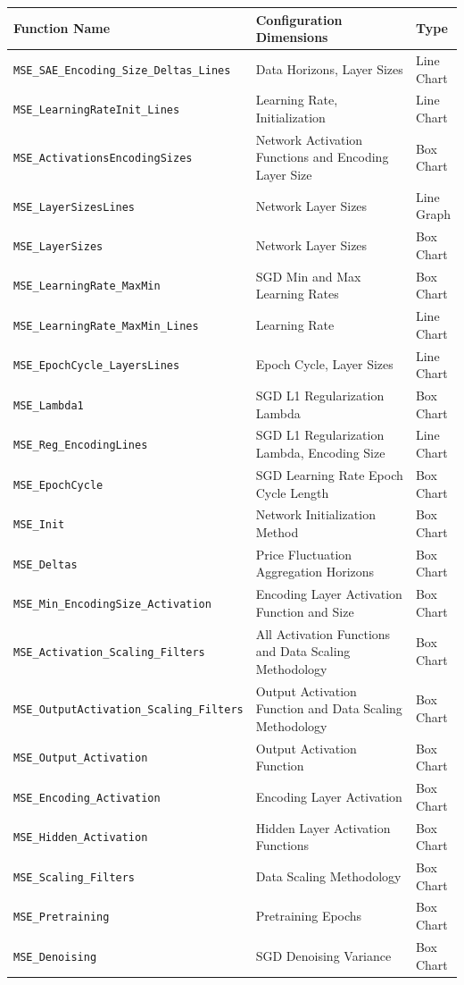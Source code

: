 \documentclass[a4paper,11pt,oneside]{article}
\theoremstyle{plain}
\theoremstyle{definition}
\begin{document}
	\newpage
	\begin{longtable}{|p{0.5\linewidth}|p{0.4\linewidth}|p{0.1\linewidth}|}
		\hline
		\rowcolor{beaublue}
		\textbf{Function Name} &\textbf{Configuration Dimensions}&\textbf{Type}  \\\hline	
		\texttt{MSE\_SAE\_Encoding\_Size\_Deltas\_Lines} & {Data Horizons, Layer Sizes}& {Line Chart} \\\hline
		\texttt{MSE\_LearningRateInit\_Lines} & {Learning Rate, Initialization}& {Line Chart} \\\hline
		\texttt{MSE\_ActivationsEncodingSizes} & {Network Activation Functions and Encoding Layer Size}& {Box Chart} \\\hline
		\texttt{MSE\_LayerSizesLines} & {Network Layer Sizes}& {Line Graph} \\\hline
		\texttt{MSE\_LayerSizes} & {Network Layer Sizes}& {Box Chart} \\\hline
		\texttt{MSE\_LearningRate\_MaxMin} & {SGD Min and Max Learning Rates}& {Box Chart} \\\hline
		\texttt{MSE\_LearningRate\_MaxMin\_Lines} & {Learning Rate}& {Line Chart} \\\hline
		\texttt{MSE\_EpochCycle\_LayersLines} & {Epoch Cycle, Layer Sizes}& {Line Chart} \\\hline		
		\texttt{MSE\_Lambda1} & {SGD L1 Regularization Lambda}& {Box Chart} \\\hline		
		\texttt{MSE\_Reg\_EncodingLines} & {SGD L1 Regularization Lambda, Encoding Size}& {Line Chart} \\\hline
		\texttt{MSE\_EpochCycle} & {SGD Learning Rate Epoch Cycle Length}& {Box Chart} \\\hline
		\texttt{MSE\_Init} & {Network Initialization Method}& {Box Chart} \\\hline
		\texttt{MSE\_Deltas} & {Price Fluctuation Aggregation Horizons}& {Box Chart} \\\hline
		\texttt{MSE\_Min\_EncodingSize\_Activation} & {Encoding Layer Activation Function and Size}& {Box Chart} \\\hline
		\texttt{MSE\_Activation\_Scaling\_Filters} & {All Activation Functions and Data Scaling Methodology}& {Box Chart} \\\hline
		\texttt{MSE\_OutputActivation\_Scaling\_Filters} & {Output Activation Function and Data Scaling Methodology}& {Box Chart} \\\hline
		\texttt{MSE\_Output\_Activation} & {Output Activation Function}& {Box Chart} \\\hline
		\texttt{MSE\_Encoding\_Activation} & {Encoding Layer Activation}& {Box Chart} \\\hline
		\texttt{MSE\_Hidden\_Activation} & {Hidden Layer Activation Functions}& {Box Chart} \\\hline
		\texttt{MSE\_Scaling\_Filters} & {Data Scaling Methodology}& {Box Chart} \\\hline
		\texttt{MSE\_Pretraining} & {Pretraining Epochs}& {Box Chart} \\\hline
		\texttt{MSE\_Denoising} & {SGD Denoising Variance}& {Box Chart} \\\hline
		

\end{longtable}
\end{document}
